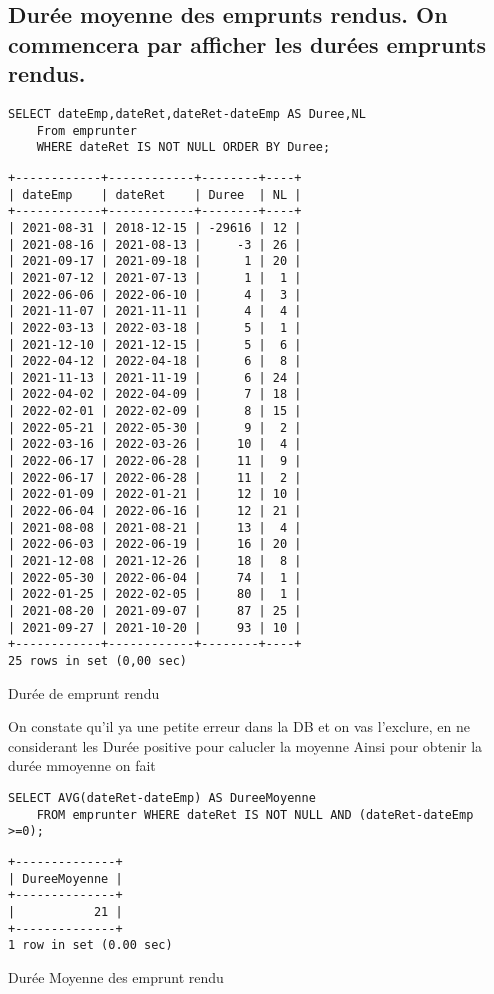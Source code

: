 \documentclass{article}
\begin{document}
\subsection{Durée moyenne des emprunts rendus. On commencera par afficher les durées emprunts rendus.}

\begin{listing}[H]
\begin{verbatim}
SELECT dateEmp,dateRet,dateRet-dateEmp AS Duree,NL 
	From emprunter 
	WHERE dateRet IS NOT NULL ORDER BY Duree;
\end{verbatim}
\begin{verbatim}
+------------+------------+--------+----+
| dateEmp    | dateRet    | Duree  | NL |
+------------+------------+--------+----+
| 2021-08-31 | 2018-12-15 | -29616 | 12 |
| 2021-08-16 | 2021-08-13 |     -3 | 26 |
| 2021-09-17 | 2021-09-18 |      1 | 20 |
| 2021-07-12 | 2021-07-13 |      1 |  1 |
| 2022-06-06 | 2022-06-10 |      4 |  3 |
| 2021-11-07 | 2021-11-11 |      4 |  4 |
| 2022-03-13 | 2022-03-18 |      5 |  1 |
| 2021-12-10 | 2021-12-15 |      5 |  6 |
| 2022-04-12 | 2022-04-18 |      6 |  8 |
| 2021-11-13 | 2021-11-19 |      6 | 24 |
| 2022-04-02 | 2022-04-09 |      7 | 18 |
| 2022-02-01 | 2022-02-09 |      8 | 15 |
| 2022-05-21 | 2022-05-30 |      9 |  2 |
| 2022-03-16 | 2022-03-26 |     10 |  4 |
| 2022-06-17 | 2022-06-28 |     11 |  9 |
| 2022-06-17 | 2022-06-28 |     11 |  2 |
| 2022-01-09 | 2022-01-21 |     12 | 10 |
| 2022-06-04 | 2022-06-16 |     12 | 21 |
| 2021-08-08 | 2021-08-21 |     13 |  4 |
| 2022-06-03 | 2022-06-19 |     16 | 20 |
| 2021-12-08 | 2021-12-26 |     18 |  8 |
| 2022-05-30 | 2022-06-04 |     74 |  1 |
| 2022-01-25 | 2022-02-05 |     80 |  1 |
| 2021-08-20 | 2021-09-07 |     87 | 25 |
| 2021-09-27 | 2021-10-20 |     93 | 10 |
+------------+------------+--------+----+
25 rows in set (0,00 sec)
\end{verbatim}
\caption{Durée de emprunt rendu}
\end{listing}
On constate qu'il ya une petite erreur dans la DB et on vas l'exclure, en ne considerant les Durée positive pour calucler la moyenne
Ainsi pour obtenir la durée mmoyenne on fait

\begin{listing}[H]
\begin{verbatim}
SELECT AVG(dateRet-dateEmp) AS DureeMoyenne 
	FROM emprunter WHERE dateRet IS NOT NULL AND (dateRet-dateEmp >=0);
\end{verbatim}
\begin{verbatim}
+--------------+
| DureeMoyenne |
+--------------+
|           21 |
+--------------+
1 row in set (0.00 sec)

\end{verbatim}
\caption{Durée Moyenne des emprunt rendu}
\end{listing}
\end{document}
